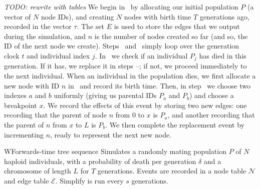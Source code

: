 \documentclass{article}
\newcommand{\jda}[1]{{\em \color{cyan} #1}}
\begin{document}
\jda{TODO: rewrite with tables}
We begin in~ by allocating our initial population $P$
(a vector of $N$ node IDs),
and creating $N$ nodes with birth time $T$ generations ago, recorded in the
vector $\tau$. The set $E$ is used to store the edges that we output during the
simulation, and $n$ is the number of nodes created so far (and so, the ID of
the next node we create). Steps~ and~ simply loop over
the generation clock $t$ and individual index $j$. In~ we check if
an individual $P_j$ has died in this generation. If it has, we replace it in
steps --; if not, we proceed immediately to the next
individual. When an individual in the population dies, we first allocate
a new node with ID $n$ in~ and record its birth time. Then,
in step~ we choose two indexes $a$ and $b$ uniformly (giving us
parental IDs $P_a$ and $P_b$) and choose a breakpoint $x$. We record the effects of this
event by storing two new edges: one recording that the parent of node $n$
from $0$ to $x$ is $P_a$, and another recording that the parent of $n$
from $x$ to $L$ is $P_b$. We then complete the replacement event by incrementing
$n$, ready to represent the next new node.

\begin{taocpalg}{W}{Forwards-time tree sequence}
{Simulates a randomly mating population $P$ of $N$ haploid individuals,
with a probability of death per generation $\delta$ and a chromosome of length
$L$ for $T$ generations. Events are recorded in a node table $\mathcal{N}$
and edge table $\mathcal{E}$. Simplify is run every $s$ generations.
}




\algstep{W4.}{Mortality.}{ If $\randomuniform([0, 1)) \geq \delta$ go to \algref{W8}.
}


\algstep{W6.}{Choose parents.}{Set $a \leftarrow \randomuniform(\{0, \dots, N - 1\})$,
    $b \leftarrow \randomuniform(\{0, \dots, N - 1\})$ and $x \leftarrow \randomuniform([0, L))$.
}





\end{taocpalg}
\end{document}
